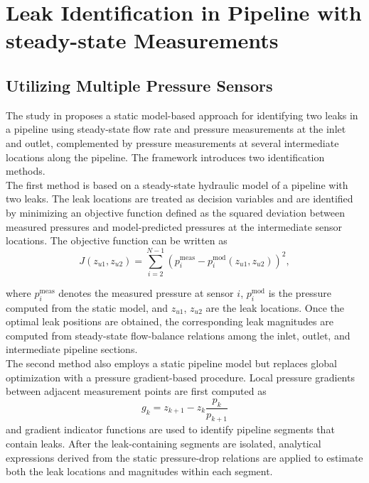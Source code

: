 \section{Leak Identification in Pipeline with steady-state Measurements}
\label{sec:lit:steadystate}

\subsection{Utilizing Multiple Pressure Sensors}

The study in \cite{ostapkowicz2023} proposes a static model-based approach for identifying two leaks in a pipeline using steady-state flow rate and pressure measurements at the inlet and outlet, complemented by pressure measurements at several intermediate locations along the pipeline. The framework introduces two identification methods.\\

The first method is based on a steady-state hydraulic model of a pipeline with two leaks. The leak locations are treated as decision variables and are identified by minimizing an objective function defined as the squared deviation between measured pressures and model-predicted pressures at the intermediate sensor locations. The objective function can be written as
\begin{equation*}
J(z_{u1}, z_{u2})
= \sum_{i=2}^{N-1} \left( p_i^{\text{meas}} - p_i^{\text{mod}}(z_{u1}, z_{u2}) \right)^2,
\end{equation*}

where $p_i^{\text{meas}}$ denotes the measured pressure at sensor $i$, $p_i^{\text{mod}}$ is the pressure computed from the static model, and $z_{u1}$, $z_{u2}$ are the leak locations. Once the optimal leak positions are obtained, the corresponding leak magnitudes are computed from steady-state flow-balance relations among the inlet, outlet, and intermediate pipeline sections.\\

The second method also employs a static pipeline model but replaces global optimization with a pressure gradient-based procedure. Local pressure gradients between adjacent measurement points are first computed as
\begin{equation*}
g_k = z_{k+1} - z_k \frac{p_k}{p_{k+1}}
\end{equation*}
and gradient indicator functions are used to identify pipeline segments that contain leaks. After the leak-containing segments are isolated, analytical expressions derived from the static pressure-drop relations are applied to estimate both the leak locations and magnitudes within each segment.\\

